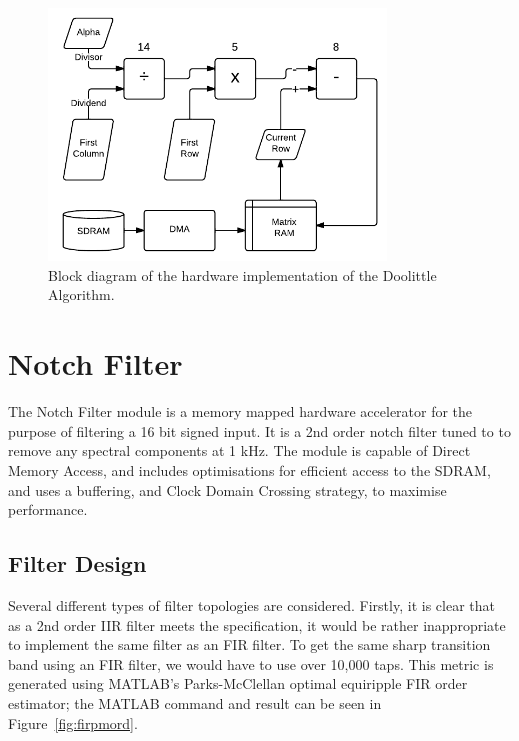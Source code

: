 \documentclass[]{article}
\begin{document}
\begin{figure}[htbp]
	\begin{center}
		\includegraphics[width = 0.8\textwidth]{DeterminantPipeline.pdf}
	\end{center}
	\caption{Block diagram of the hardware implementation of the Doolittle Algorithm.}
	\label{fig:det_block}
\end{figure}







\clearpage


\section{Notch Filter} %
\label{sec:notch_filter}

The Notch Filter module is a memory mapped hardware accelerator for the purpose of filtering a 16 bit signed input. It is a 2nd order notch filter tuned to to remove any spectral components at 1 kHz.
The module is capable of Direct Memory Access, and includes optimisations for efficient access to the SDRAM, and uses a buffering, and Clock Domain Crossing strategy, to maximise performance.

\subsection{Filter Design} %
\label{sub:filter_design}

Several different types of filter topologies are considered. Firstly, it is clear that as a 2nd order IIR filter meets the specification, it would be rather inappropriate to implement the same filter as an FIR filter. To get the same sharp transition band using an FIR filter, we would have to use over 10,000 taps. This metric is generated using MATLAB's Parks-McClellan optimal equiripple FIR order estimator; the MATLAB command and result can be seen in Figure~\ref{fig:firpmord}.
\end{document}
